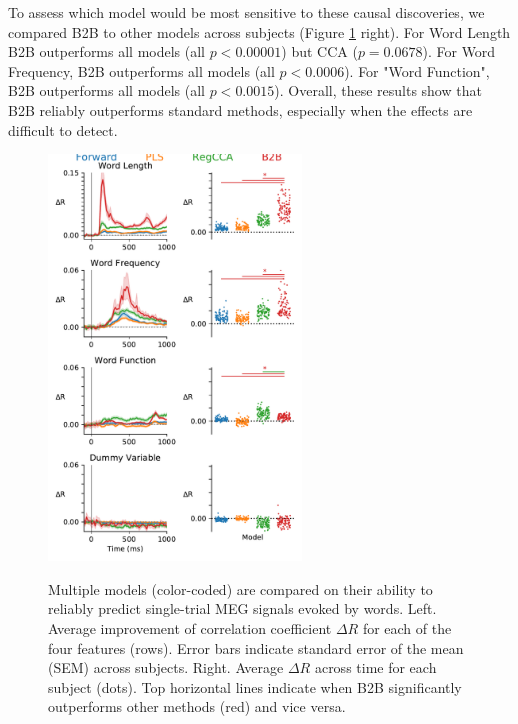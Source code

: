 To assess which model would be most sensitive to these causal discoveries, we compared B2B to other models across subjects (Figure \ref{fig:meg_results} right). For Word Length B2B outperforms all models (all $p < 0.00001$) but CCA ($p=0.0678$). For Word Frequency, B2B outperforms all models (all $p < 0.0006$). For "Word Function", B2B outperforms all models (all $p < 0.0015$). Overall, these results show that B2B reliably outperforms standard methods, especially when the effects are difficult to detect.


\begin{figure}
  \vspace{-12ex}
  \begin{center}
    \includegraphics[width=0.6\textwidth, trim=0cm 0cm 0cm 0cm, clip=True]{figures/meg.pdf}
    \label{fig:meg_results}
  \end{center}
  \vspace{-5ex}
  \caption{Multiple models (color-coded) are compared on their ability to reliably predict single-trial MEG signals evoked by words. Left. Average improvement of correlation coefficient $\Delta R$ for each of the four features (rows). Error bars indicate standard error of the mean (SEM) across subjects. Right. Average $\Delta R$ across time for each subject (dots). Top horizontal lines indicate when B2B significantly outperforms other methods (red) and vice versa.}
\end{figure}
